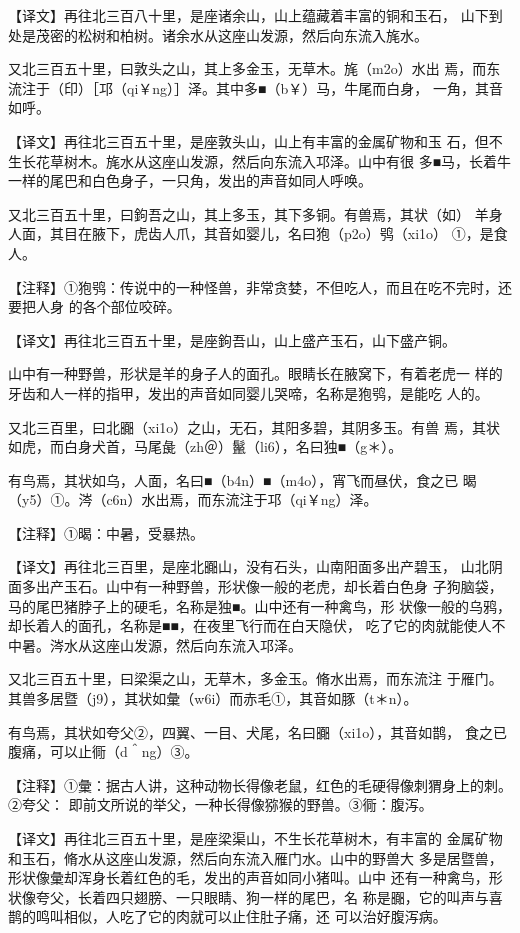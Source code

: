 \documentclass[a4paper,12pt,UTF8,twoside]{ctexbook}
\begin{document}
【译文】再往北三百八十里，是座诸余山，山上蕴藏着丰富的铜和玉石， 山下到处是茂密的松树和柏树。诸余水从这座山发源，然后向东流入旄水。

又北三百五十里，曰敦头之山，其上多金玉，无草木。旄（m2o）水出 焉，而东流注于（印）［邛（qi￥ng）］泽。其中多■（b￥）马，牛尾而白身， 一角，其音如呼。

【译文】再往北三百五十里，是座敦头山，山上有丰富的金属矿物和玉 石，但不生长花草树木。旄水从这座山发源，然后向东流入邛泽。山中有很 多■马，长着牛一样的尾巴和白色身子，一只角，发出的声音如同人呼唤。

又北三百五十里，曰鉤吾之山，其上多玉，其下多铜。有兽焉，其状（如） 羊身人面，其目在腋下，虎齿人爪，其音如婴儿，名曰狍（p2o）鸮（xi1o） ①，是食人。

【注释】①狍鸮：传说中的一种怪兽，非常贪婪，不但吃人，而且在吃不完时，还要把人身 的各个部位咬碎。

【译文】再往北三百五十里，是座鉤吾山，山上盛产玉石，山下盛产铜。

山中有一种野兽，形状是羊的身子人的面孔。眼睛长在腋窝下，有着老虎一 样的牙齿和人一样的指甲，发出的声音如同婴儿哭啼，名称是狍鸮，是能吃 人的。

又北三百里，曰北嚻（xi1o）之山，无石，其阳多碧，其阴多玉。有兽 焉，其状如虎，而白身犬首，马尾彘（zh＠）鬣（li6），名曰独■（g＊）。

有鸟焉，其状如乌，人面，名曰■（b4n）■（m4o），宵飞而昼伏，食之已 暍（y5）①。涔（c6n）水出焉，而东流注于邛（qi￥ng）泽。

【注释】①暍：中暑，受暴热。

【译文】再往北三百里，是座北嚻山，没有石头，山南阳面多出产碧玉， 山北阴面多出产玉石。山中有一种野兽，形状像一般的老虎，却长着白色身 子狗脑袋，马的尾巴猪脖子上的硬毛，名称是独■。山中还有一种禽鸟，形 状像一般的乌鸦，却长着人的面孔，名称是■■，在夜里飞行而在白天隐伏， 吃了它的肉就能使人不中暑。涔水从这座山发源，然后向东流入邛泽。

又北三百五十里，曰梁渠之山，无草木，多金玉。脩水出焉，而东流注 于雁门。其兽多居暨（j9），其状如彙（w6i）而赤毛①，其音如豚（t＊n）。

有鸟焉，其状如夸父②，四翼、一目、犬尾，名曰嚻（xi1o），其音如鹊， 食之已腹痛，可以止衕（d＾ng）③。

【注释】①彙：据古人讲，这种动物长得像老鼠，红色的毛硬得像刺猬身上的刺。②夸父： 即前文所说的举父，一种长得像猕猴的野兽。③衕：腹泻。

【译文】再往北三百五十里，是座梁渠山，不生长花草树木，有丰富的 金属矿物和玉石，脩水从这座山发源，然后向东流入雁门水。山中的野兽大 多是居暨兽，形状像彙却浑身长着红色的毛，发出的声音如同小猪叫。山中 还有一种禽鸟，形状像夸父，长着四只翅膀、一只眼睛、狗一样的尾巴，名 称是嚻，它的叫声与喜鹊的鸣叫相似，人吃了它的肉就可以止住肚子痛，还 可以治好腹泻病。
\end{document}
